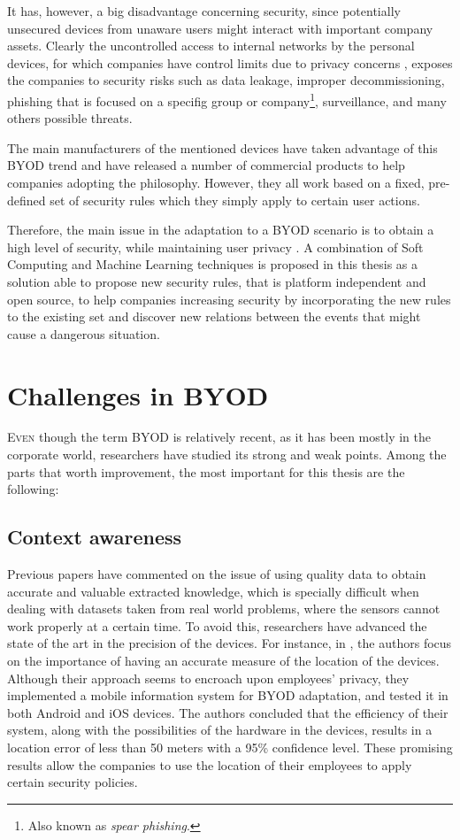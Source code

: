 It has, however, a big disadvantage concerning security, since potentially unsecured devices from unaware users might interact with important company assets. Clearly the uncontrolled access to internal networks by the personal devices, for which companies have control limits due to privacy concerns \cite{miller2012byod}, exposes the companies to security risks such as data leakage, improper decommissioning, phishing that is focused on a specifig group or company\footnote{Also known as \textit{spear phishing}.}, surveillance, and many others possible threats\cite{lennon2012changing}.

The main manufacturers of the mentioned devices have taken advantage of this BYOD trend and have released a number of commercial products to help companies adopting the philosophy. However, they all work based on a fixed, pre-defined set of security rules which they simply apply to certain user actions.

Therefore, the main issue in the adaptation to a BYOD scenario is to obtain a high level of security, while maintaining user privacy \cite{miller2012byod}. A combination of Soft Computing and Machine Learning techniques is proposed in this thesis as a solution able to propose new security rules, that is platform independent and open source, to help companies increasing security by incorporating the new rules to the existing set and discover new relations between the events that might cause a dangerous situation.

\section{Challenges in BYOD}
\label{sec:intro:challenges}

\lettrine{E}{ven} though the term BYOD is relatively recent, as it has been mostly in the corporate world, researchers have studied its strong and weak points. Among the parts that worth improvement, the most important for this thesis are the following:

\subsection{Context awareness}
\label{subsec:context}

Previous papers have commented on the issue of using quality data to obtain accurate and valuable extracted knowledge, which is specially difficult when dealing with datasets taken from real world problems, where the sensors cannot work properly at a certain time. To avoid this, researchers have advanced the state of the art in the precision of the devices. For instance, in \cite{rios2015mobile}, the authors focus on the importance of having an accurate measure of the location of the devices. Although their approach seems to encroach upon employees' privacy, they implemented a mobile information system for BYOD adaptation, and tested it in both Android and iOS devices. The authors concluded that the efficiency of their system, along with the possibilities of the hardware in the devices, results in a location
error of less than 50 meters with a 95\% confidence level. These promising results allow the companies to use the location of their employees to apply certain security policies.

